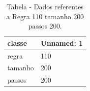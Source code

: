 \begin{table}[H]
\centering
\caption{Tabela - Dados referentes a Regra 110 tamanho 200 passos 200.}
\label{tab:regra_110_tamanho_200_passos_200}
\begin{tabular}{ll}
\toprule
classe & Unnamed: 1 \\
\midrule
regra & 110 \\
tamanho & 200 \\
passos & 200 \\
\bottomrule
\end{tabular}

\end{table}
